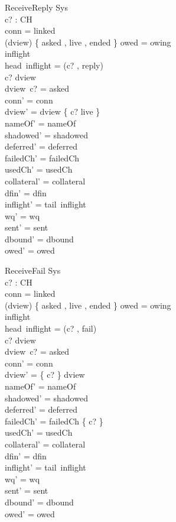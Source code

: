 \documentclass[a4paper,10pt,fleqn]{article}
\begin{document}
\begin{schema}{ReceiveReply}
  \Delta Sys \\
  c? : CH \\
\where
  conn = linked \\
  (\ran dview) \cap \{ asked , live , ended \} \neq \emptyset \lor owed = owing \\
  inflight \neq \langle \rangle \\
  head~inflight = (c? , reply) \\
  c? \in \dom dview \\
  dview~c? = asked \\
  conn' = conn \\
  dview' = dview \oplus \{ c? \mapsto live \} \\
  nameOf' = nameOf \\
  shadowed' = shadowed \\
  deferred' = deferred \\
  failedCh' = failedCh \\
  usedCh' = usedCh \\
  collateral' = collateral \\
  dfin' = dfin \\
  inflight' = tail~inflight \\
  wq' = wq \\
  sent' = sent \\
  dbound' = dbound \\
  owed' = owed
\end{schema}

\begin{schema}{ReceiveFail}
  \Delta Sys \\
  c? : CH \\
\where
  conn = linked \\
  (\ran dview) \cap \{ asked , live , ended \} \neq \emptyset \lor owed = owing \\
  inflight \neq \langle \rangle \\
  head~inflight = (c? , fail) \\
  c? \in \dom dview \\
  dview~c? = asked \\
  conn' = conn \\
  dview' = \{ c? \} \ndres dview \\
  nameOf' = nameOf \\
  shadowed' = shadowed \\
  deferred' = deferred \\
  failedCh' = failedCh \cup \{ c? \} \\
  usedCh' = usedCh \\
  collateral' = collateral \\
  dfin' = dfin \\
  inflight' = tail~inflight \\
  wq' = wq \\
  sent' = sent \\
  dbound' = dbound \\
  owed' = owed
\end{schema}
\end{document}
